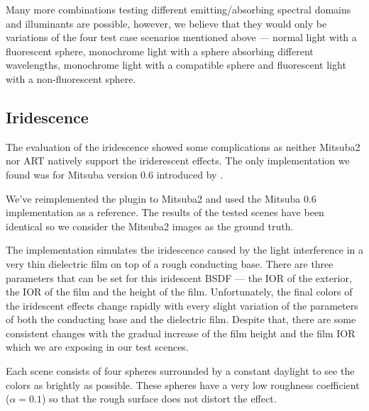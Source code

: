 \begin{description}
\begin{figure}[H]
		\caption{}
		\label{fig:fluorescent_sphere_fluoD50_nonfluo}
	\end{figure}
\end{description}

Many more combinations testing different emitting/absorbing spectral domains and illuminants are possible, however, we believe that they would only be variations of the four test case scenarios mentioned above --- normal light with a fluorescent sphere, monochrome light with a sphere absorbing different wavelengths, monochrome light with a compatible sphere and fluorescent light with a non-fluorescent sphere.

\subsection{Iridescence}

The evaluation of the iridescence showed some complications as neither Mitsuba2 nor ART natively support the iriderescent effects. The only implementation we found was for Mitsuba version 0.6 introduced by \citet{belcour2017practical}.

We've reimplemented the plugin to Mitsuba2 and used the Mitsuba 0.6 implementation as a reference. The results of the tested scenes have been identical so we consider the Mitsuba2 images as the ground truth.

The implementation simulates the iridescence caused by the light interference in a very thin dielectric film on top of a rough conducting base. There are three parameters that can be set for this iridescent BSDF --- the IOR of the exterior, the IOR of the film and the height of the film. Unfortunately, the final colors of the iridescent effects change rapidly with every slight variation of the parameters of both the conducting base and the dielectric film. Despite that, there are some consistent changes with the gradual increase of the film height and the film IOR which we are exposing in our test scences. 

Each scene consists of four spheres surrounded by a constant daylight to see the colors as brightly as possible. These spheres have a very low roughness coefficient ($\alpha=0.1$) so that the rough surface does not distort the effect.


